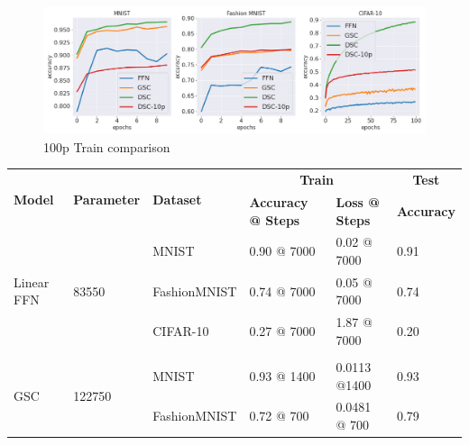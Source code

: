 \documentclass{article}
\begin{document}
\begin{figure}[h!]
\centering
\includegraphics[scale=0.3]{paper/100p_runs.png}
\caption{100p Train comparison}
\label{fig:infotransfer}
\end{figure}

\begin{table}[H]
\centering
\begin{tabular}{llllll}
\hline
\multirow{2}{*}{\textbf{Model}}   & \multirow{2}{*}{\textbf{Parameter}} & \multirow{2}{*}{\textbf{Dataset}} & \multicolumn{2}{c}{\textbf{Train}}                & \multicolumn{1}{c}{\textbf{Test}} \\ \cline{4-6} 
                                  &                                     &                                   & \textbf{Accuracy @ Steps} & \textbf{Loss @ Steps} & \textbf{Accuracy}                 \\ \cline{1-3}
\multirow{3}{*}{Linear FFN}       & \multirow{3}{*}{83550}          & MNIST                    & 0.90 @ 7000          & 0.02 @ 7000          & 0.91                     \\
                                  &                                 & FashionMNIST             & 0.74 @ 7000          & 0.05 @ 7000          & 0.74                     \\
                                  &                                 & CIFAR-10                 & 0.27 @ 7000          & 1.87 @ 7000          & 0.20                     \\
                                  &                                 &                          &                      &                      &                          \\
\multirow{3}{*}{GSC}              & \multirow{3}{*}{122750}         & MNIST                    & 0.93 @ 1400          & 0.0113 @1400         & 0.93                     \\
                                  &                                 & FashionMNIST             & 0.72 @ 700           & 0.0481 @ 700         & 0.79                     \\

\end{tabular}
\end{table}
\end{document}
